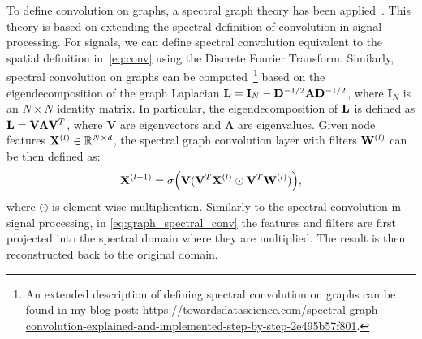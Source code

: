 To define convolution on graphs, a spectral graph theory has been applied~\citep{bruna2013spectral}. This theory is based on extending the spectral definition of convolution in signal processing. For signals, we can define spectral convolution equivalent to the spatial definition in~\eqref{eq:conv} using the Discrete Fourier Transform. Similarly, spectral convolution on graphs can be computed~\citep{belkin2001laplacian,chung1997spectral,bruna2013spectral}\footnote{An extended description of defining spectral convolution on graphs can be found in my blog post: \url{https://towardsdatascience.com/spectral-graph-convolution-explained-and-implemented-step-by-step-2e495b57f801}.} based on the eigendecomposition of the graph Laplacian $\mathbf{L} = \mathbf{I}_N - \mathbf{D}^{-1/2}\mathbf{A}\mathbf{D}^{-1/2}$, where $\mathbf{I}_N$ is an $N \times N$ identity matrix. In particular, the eigendecomposition of $\mathbf{L}$ is defined as $\mathbf{L}=\mathbf{V}\mathbf{\Lambda}\mathbf{V}^T$, where $\mathbf{V}$ are eigenvectors and $\mathbf{\Lambda}$ are eigenvalues.
Given node features $\mathbf{X}^{(l)} \in \mathbb{R}^{N \times d}$, the spectral graph convolution layer with filters $\mathbf{W}^{(l)}$ can be then defined as:
%
\begin{equation}
 \label{eq:graph_spectral_conv}    
 \mathbf{X}^{(l+1)} = \sigma \Big( \mathbf{V} (\mathbf{V}^T\mathbf{X}^{(l)} \odot \mathbf{V}^T\mathbf{W}^{(l)}) \Big),
\end{equation}
%
\noindent where $\odot$ is element-wise multiplication. Similarly to the spectral convolution in signal processing, in \eqref{eq:graph_spectral_conv} the features and filters are first projected into the spectral domain where they are multiplied. The result is then reconstructed back to the original domain.

